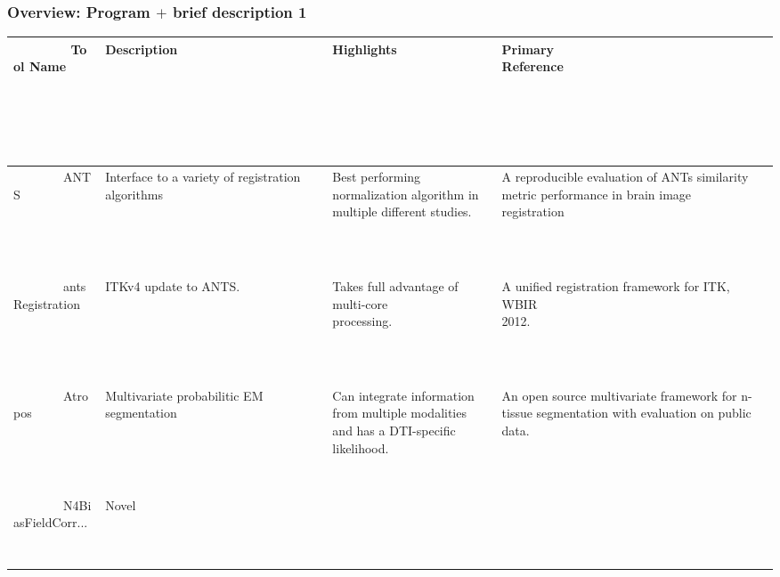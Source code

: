 \documentclass[18pt]{beamer}
\begin{document}
\begin{frame}
\frametitle{Overview:  Program $+$ brief description 1}
\begin{tiny}
{
\begin{table}
\begin{tabular}{|p{2.0cm}|p{2.5cm}|p{3cm}|p{3cm}|}
\hline
        Tool Name                                     & Description                                                                                                                                                    & Highlights                                                                                                         & Primary Reference                                                                                                                                                                                   \\ \hline
        ANTS                                          & Interface to a
variety of registration algorithms & Best performing normalization algorithm in multiple different studies.                                             & A reproducible evaluation of ANTs similarity metric performance in brain image registration                                                                                                         \\ 
        antsRegistration                              & ITKv4 update to ANTS.                                                    & Takes full advantage of multi-core processing.                                                                     & A unified registration framework for ITK, WBIR 2012.                                                                                                                                                \\ 
        Atropos                                       & Multivariate probabilitic EM segmentation                                                                                                                      & Can integrate information from multiple modalities and has a DTI-specific likelihood.                              & An open source multivariate framework for n-tissue segmentation with evaluation on public data.                                                                                                     \\ 
        N4BiasFieldCorr...                         & Novel

\end{tabular}
\end{table}}
\end{tiny}
\end{frame}
\end{document}
